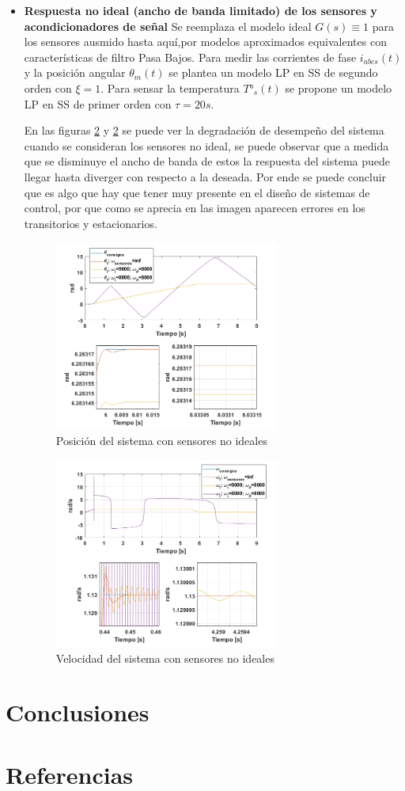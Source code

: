\documentclass[10pt]{article}
\begin{document}
\begin{itemize}
\item \textbf{Respuesta no ideal (ancho de banda limitado) de los sensores y acondicionadores de señal}
Se reemplaza el modelo ideal $G(s)\equiv 1$ para los sensores ausmido hasta aquí,por modelos aproximados equivalentes con características de filtro Pasa Bajos.
Para medir las corrientes de fase $i_{abcs}(t)$ y la posición angular $\theta_{m}(t)$ se plantea un modelo LP en SS de segundo orden con $\xi=1$. Para sensar la temperatura $T°_{s}(t)$ se propone un modelo LP en SS de primer orden con $\tau=20s$.

En las figuras \ref{} y \ref{} se puede ver la degradación de desempeño del sistema cuando se consideran los sensores no ideal, se puede observar que a medida que se disminuye el ancho de banda de estos
 la respuesta del sistema puede llegar hasta diverger con respecto a la deseada. Por ende se puede concluir que es algo que hay que tener muy presente en el diseño de sistemas de control, por que como se 
 aprecia en las imagen aparecen errores en los transitorios y estacionarios.
 \begin{figure}[h!]
	\centering
	\includegraphics[width=0.7\textwidth]{theta_consignas.png}
	\caption{\label{fig:theta_consignas}Posición del sistema con sensores no ideales}
	\end{figure}
 \begin{figure}[h!]
	\centering
	\includegraphics[width=0.7\textwidth]{omega_sensores.png}
	\caption{\label{fig:omega_sensores}Velocidad del sistema con sensores no ideales}
	\end{figure}

\end{itemize}
\section{Conclusiones}

\section{Referencias}
\end{document}
